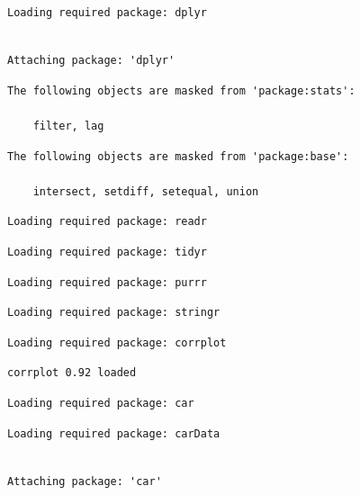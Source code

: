 \documentclass[
  letterpaper,
  DIV=11,
  numbers=noendperiod]{scrartcl}
\begin{document}
\begin{verbatim}
Loading required package: dplyr
\end{verbatim}

\begin{verbatim}

Attaching package: 'dplyr'
\end{verbatim}

\begin{verbatim}
The following objects are masked from 'package:stats':

    filter, lag
\end{verbatim}

\begin{verbatim}
The following objects are masked from 'package:base':

    intersect, setdiff, setequal, union
\end{verbatim}

\begin{verbatim}
Loading required package: readr
\end{verbatim}

\begin{verbatim}
Loading required package: tidyr
\end{verbatim}

\begin{verbatim}
Loading required package: purrr
\end{verbatim}

\begin{verbatim}
Loading required package: stringr
\end{verbatim}

\begin{verbatim}
Loading required package: corrplot
\end{verbatim}

\begin{verbatim}
corrplot 0.92 loaded
\end{verbatim}

\begin{verbatim}
Loading required package: car
\end{verbatim}

\begin{verbatim}
Loading required package: carData
\end{verbatim}

\begin{verbatim}

Attaching package: 'car'
\end{verbatim}
\end{document}

